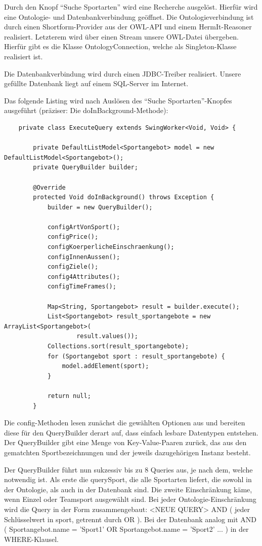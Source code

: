 Durch den Knopf "`Suche Sportarten"' wird eine Recherche ausgelöst. Hierfür wird eine Ontologie- und Datenbankverbindung geöffnet.
Die Ontologieverbindung ist durch einen Shortform-Provider aus der OWL-API und einem HermIt-Reasoner realisiert. Letzterem wird über einen Stream unsere OWL-Datei übergeben. Hierfür gibt es die Klasse OntologyConnection, welche als Singleton-Klasse realisiert ist.

Die Datenbankverbindung wird durch einen JDBC-Treiber realisiert. Unsere gefüllte Datenbank liegt auf einem SQL-Server im Internet.

Das folgende Listing wird nach Auslösen des "`Suche Sportarten"'-Knopfes ausgeführt (präziser: Die doInBackground-Methode):


\begin{lstlisting}
	private class ExecuteQuery extends SwingWorker<Void, Void> {

		private DefaultListModel<Sportangebot> model = new DefaultListModel<Sportangebot>();
		private QueryBuilder builder;

		@Override
		protected Void doInBackground() throws Exception {
			builder = new QueryBuilder();

			configArtVonSport();
			configPrice();
			configKoerperlicheEinschraenkung();
			configInnenAussen();
			configZiele();
			config4Attributes();
			configTimeFrames();

			Map<String, Sportangebot> result = builder.execute();
			List<Sportangebot> result_sportangebote = new ArrayList<Sportangebot>(
					result.values());
			Collections.sort(result_sportangebote);
			for (Sportangebot sport : result_sportangebote) {
				model.addElement(sport);
			}

			return null;
		}
\end{lstlisting}

Die config-Methoden lesen zunächst die gewählten Optionen aus und bereiten diese für den QueryBuilder derart auf, dass einfach lesbare Datentypen entstehen. Der QueryBuilder gibt eine Menge von Key-Value-Paaren zurück, das aus den gematchten Sportbezeichnungen und der jeweils dazugehörigen Instanz besteht.

Der QueryBuilder führt nun sukzessiv bis zu 8 Queries aus, je nach dem, welche notwendig ist. Als erste die querySport, die alle Sportarten liefert, die sowohl in der Ontologie, als auch in der Datenbank sind. Die zweite Einschränkung käme, wenn Einzel oder Teamsport ausgewählt sind. Bei jeder Ontologie-Einschränkung wird die Query in der Form zusammengebaut: <NEUE QUERY> AND ( jeder Schlüsselwert in sport, getrennt durch OR ). Bei der Datenbank analog mit AND ( Sportangebot.name = 'Sport1' OR Sportangebot.name = 'Sport2' ... ) in der WHERE-Klausel.

